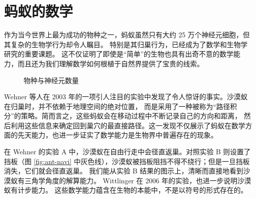 \chapter{蚂蚁的数学}

作为当今世界上最为成功的物种之一，蚂蚁虽然只有大约 25 万个神经元细胞，但其复杂的生物学行为却令人瞩目。
特别是其归巢行为，已经成为了数学和生物学研究的重要课题。\cite{Wehner2003DesertAN}
这不仅证明了即使是“简单”的生物也具有出奇不意的数学能力，而且还为我们理解数学如何根植于自然界提供了宝贵的线索。

\begin{figure}[ht]\centering
{}
\caption{物种与神经元数量}
\end{figure}

Wehner 等人在 2003 年的一项引人注目的实验中发现了令人惊讶的事实。沙漠蚁在归巢时，并不依赖于地理空间的绝对位置，
而是采用了一种被称为“路径积分”的策略。\cite{Wehner2003DesertAN}简而言之，这些蚂蚁会在移动过程中不断记录自己的方向和距离，
然后利用这些信息来确定回到巢穴的最直接路径。这一发现不仅展示了蚂蚁在数学方面的先天能力，也进一步证实了数学能力是生物界中普遍存在的现象。

在 Wehner 的实验 A 中，沙漠蚁在自由行走中会径直返巢。对照实验 B 则设置了挡板（图 \ref{fig:ant-navi} 中灰色线），沙漠蚁被挡板阻挡不得不绕行；但是一旦挡板消失，它们就会径直返巢。
我们能从实验 B 结果的图示上，清晰而直接地看到沙漠蚁有三角学角度的解算能力。
Wittlinger 在 2006 年的实验，也进一步说明沙漠蚁有计步能力。\cite{Wittlinger2006TheAO}
这些数学能力蕴含在生物的本能中，不是以符号的形式存在的。

